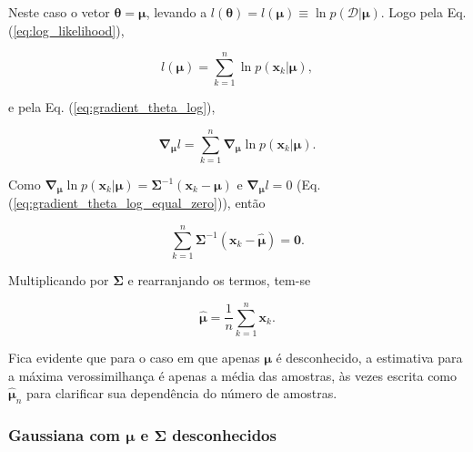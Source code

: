 \documentclass[a4paper,12pt,twocolumn]{article}
\newcommand{\equationref}[1]{Eq. (\ref{eq:#1})}
\begin{document}
Neste caso o vetor $\boldsymbol{\theta} = \boldsymbol{\mu}$, levando a $l(\boldsymbol{\theta}) = l(\boldsymbol{\mu}) \equiv \ln p(\mathcal{D}|\boldsymbol{\mu})$. Logo pela \equationref{log_likelihood},

\begin{equation}
    l(\boldsymbol{\mu}) = \sum_{k=1}^{n} \ln p(\boldsymbol{x}_k|\boldsymbol{\mu}),
    \label{eq:log_mu}
\end{equation}

\noindent e pela \equationref{gradient_theta_log},

\begin{equation}
    \boldsymbol{\nabla}_{\boldsymbol{\mu}} l = \sum_{k=1}^{n} \boldsymbol{\nabla}_{\boldsymbol{\mu}} \ln p(\boldsymbol{x}_k|\boldsymbol{\mu}).
    \label{eq:nabla_mu_log}
\end{equation}

\noindent Como $\boldsymbol{\nabla}_{\boldsymbol{\mu}} \ln p(\boldsymbol{x}_k|\boldsymbol{\mu}) = \boldsymbol{\Sigma}^{-1} (\boldsymbol{x}_k - \boldsymbol{\mu})$ e $\boldsymbol{\nabla}_{\boldsymbol{\mu}} l = 0$ (\equationref{gradient_theta_log_equal_zero}), então

\begin{equation}
    \sum_{k=1}^{n} \boldsymbol{\Sigma}^{-1} (\boldsymbol{x}_k - \boldsymbol{\hat{\mu}}) = \boldsymbol{0}.
    \label{eq:nabla_mu_log_equals_zero}
\end{equation}

\noindent Multiplicando por $\boldsymbol{\Sigma}$ e rearranjando os termos, tem-se

\begin{equation}
    \boldsymbol{\hat{\mu}} = \frac{1}{n} \sum_{k=1}^{n} \boldsymbol{x}_k.
    \label{eq:mu_optimum}
\end{equation}

Fica evidente que para o caso em que apenas $\boldsymbol{\mu}$ é desconhecido, a estimativa para a máxima verossimilhança é apenas a média das amostras, às vezes escrita como $\boldsymbol{\hat{\mu}}_n$ para clarificar sua dependência do número de amostras.

\subsubsection*{Gaussiana com $\boldsymbol{\mu}$ e $\boldsymbol{\Sigma}$ desconhecidos}
\end{document}
